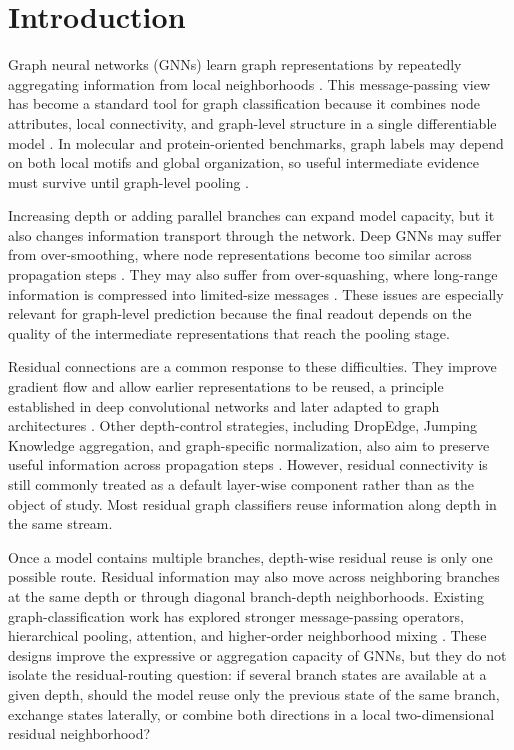 \section{Introduction}

Graph neural networks (GNNs) learn graph representations by repeatedly aggregating information from local neighborhoods \cite{gori2005new,kipf2017gcn}. This message-passing view has become a standard tool for graph classification because it combines node attributes, local connectivity, and graph-level structure in a single differentiable model \cite{gilmer2017neural,wu2020comprehensive}. In molecular and protein-oriented benchmarks, graph labels may depend on both local motifs and global organization, so useful intermediate evidence must survive until graph-level pooling \cite{duvenaud2015convolutional,ying2018hierarchical}.

Increasing depth or adding parallel branches can expand model capacity, but it also changes information transport through the network. Deep GNNs may suffer from over-smoothing, where node representations become too similar across propagation steps \cite{li2018deeper,oono2020simple}. They may also suffer from over-squashing, where long-range information is compressed into limited-size messages \cite{alon2020bottleneck,topping2021understanding}. These issues are especially relevant for graph-level prediction because the final readout depends on the quality of the intermediate representations that reach the pooling stage.

Residual connections are a common response to these difficulties. They improve gradient flow and allow earlier representations to be reused, a principle established in deep convolutional networks and later adapted to graph architectures \cite{he2016deep,bresson2017residual}. Other depth-control strategies, including DropEdge, Jumping Knowledge aggregation, and graph-specific normalization, also aim to preserve useful information across propagation steps \cite{rong2019dropedge,xu2018representation}. However, residual connectivity is still commonly treated as a default layer-wise component rather than as the object of study. Most residual graph classifiers reuse information along depth in the same stream.

Once a model contains multiple branches, depth-wise residual reuse is only one possible route. Residual information may also move across neighboring branches at the same depth or through diagonal branch-depth neighborhoods. Existing graph-classification work has explored stronger message-passing operators, hierarchical pooling, attention, and higher-order neighborhood mixing \cite{abu2019mixhop,bianchi2020graph}. These designs improve the expressive or aggregation capacity of GNNs, but they do not isolate the residual-routing question: if several branch states are available at a given depth, should the model reuse only the previous state of the same branch, exchange states laterally, or combine both directions in a local two-dimensional residual neighborhood?


